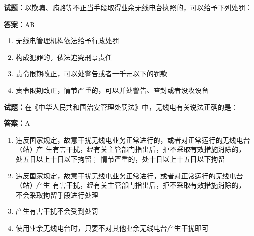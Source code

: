 \documentclass{ctexbook}
\begin{document}




\vspace{1em}

\textbf{试题：}以欺骗、贿赂等不正当手段取得业余无线电台执照的，可以给予下列处罚： 

\textbf{答案：}AB 

\begin{enumerate}[leftmargin=3em]
  \item 无线电管理机构依法给予行政处罚 

  \item 构成犯罪的，依法追究刑事责任 

  \item 责令限期改正，可以处警告或者一千元以下的罚款 

  \item 责令限期改正，情节严重的，可以并处警告、查封或者没收设备 

\end{enumerate}





\vspace{1em}

\textbf{试题：}在《中华人民共和国治安管理处罚法》中，无线电有关说法正确的是： 

\textbf{答案：}A 

\begin{enumerate}[leftmargin=3em]
  \item 违反国家规定，故意干扰无线电业务正常进行的，或者对正常运行的无线电台（站）产
生有害干扰，经有关主管部门指出后，拒不采取有效措施消除的，处五日以上十日以下拘留；
情节严重的，处十日以上十五日以下拘留 


  \item 违反国家规定，故意干扰无线电业务正常进行，或者对正常运行的无线电台（站）产生
有害干扰，经有关主管部门指出后，拒不采取有效措施消除的，不会采取拘留手段进行处理 

  \item 产生有害干扰不会受到处罚 

  \item 使用业余无线电台时，只要不对其他业余无线电台产生干扰即可 

\end{enumerate}


\end{document}
